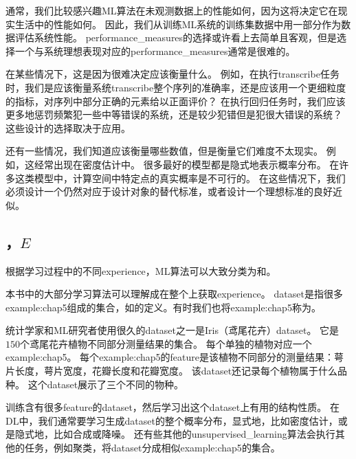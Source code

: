 
通常，我们比较感兴趣\gls{ML}算法在未观测数据上的性能如何，因为这将决定它在现实生活中的性能如何。
因此，我们从训练\gls{ML}系统的训练集数据中用一部分作为数据评估系统性能。
\gls{performance_measures}的选择或许看上去简单且客观，但是选择一个与系统理想表现对应的\gls{performance_measures}通常是很难的。

在某些情况下，这是因为很难决定应该衡量什么。
例如，在执行\gls{transcribe}任务时，我们是应该衡量系统\gls{transcribe}整个序列的准确率，还是应该用一个更细粒度的指标，对序列中部分正确的元素给以正面评价？
在执行回归任务时，我们应该更多地惩罚频繁犯一些中等错误的系统，还是较少犯错但是犯很大错误的系统？
这些设计的选择取决于应用。

还有一些情况，我们知道应该衡量哪些数值，但是衡量它们难度不太现实。
例如，这经常出现在密度估计中。
很多最好的模型都是隐式地表示概率分布。
在许多这类模型中，计算空间中特定点的真实概率是不可行的。
在这些情况下，我们必须设计一个仍然对应于设计对象的替代标准，或者设计一个理想标准的良好近似。

\subsection{，$E$}
\label{sec:the_experience_e}
根据学习过程中的不同\gls{experience}，\gls{ML}算法可以大致分类为和。

本书中的大部分学习算法可以理解成在整个上获取\gls{experience}。
\gls{dataset}是指很多\gls{example:chap5}组成的集合，如的定义。有时我们也将\gls{example:chap5}称为。


统计学家和\gls{ML}研究者使用很久的\gls{dataset}之一是Iris（鸢尾花卉）\gls{dataset}\citep{Fisher-1936}。
它是$150$个鸢尾花卉植物不同部分测量结果的集合。
每个单独的植物对应一个\gls{example:chap5}。
每个\gls{example:chap5}的\gls{feature}是该植物不同部分的测量结果：萼片长度，萼片宽度，花瓣长度和花瓣宽度。
该\gls{dataset}还记录每个植物属于什么品种。
这个\gls{dataset}展示了三个不同的物种。

训练含有很多\gls{feature}的\gls{dataset}，然后学习出这个\gls{dataset}上有用的结构性质。
在\gls{DL}中，我们通常要学习生成\gls{dataset}的整个概率分布，显式地，比如密度估计，或是隐式地，比如合成或降噪。
还有些其他的\gls{unsupervised_learning}算法会执行其他的任务，例如聚类，将\gls{dataset}分成相似\gls{example:chap5}的集合。


